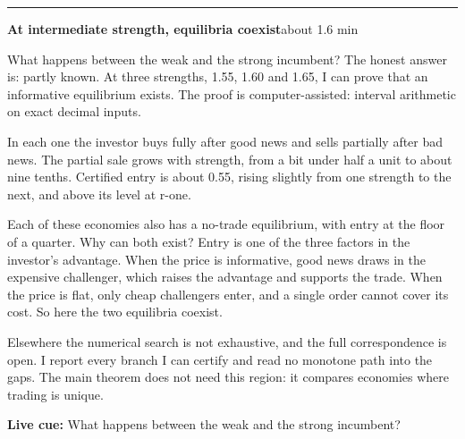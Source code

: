 \documentclass[11pt]{article}
\newcommand{\Cue}[1]{\par\nobreak\smallskip\noindent
  \textcolor{ScriptGray}{\footnotesize\textbf{Live cue:} #1}\par}
\newcommand{\scriptframe}[3]{%
  \Needspace{9\baselineskip}%
  \par\medskip\noindent\textcolor{ScriptBlue}{\rule{\linewidth}{0.55pt}}%
  \par\smallskip\noindent
  \textbf{#1}\hfill\textcolor{ScriptGray}{\small #2}\par\smallskip
  #3\par}
\begin{document}
\scriptframe{At intermediate strength, equilibria coexist}{about 1.6 min}{%
  What happens between the weak and the strong incumbent? The honest answer is:
  partly known. At three strengths, 1.55, 1.60 and 1.65, I can prove that an
  informative equilibrium exists.
  The proof is computer-assisted: interval arithmetic on exact decimal inputs.

  In each one the investor buys fully after good news and sells partially after
  bad news. The partial sale grows with strength, from a bit under half a unit
  to about nine tenths.
  Certified entry is about 0.55, rising slightly from one strength to the next,
  and above its level at r-one.

  Each of these economies also has a no-trade equilibrium, with entry at the
  floor of a quarter.
  Why can both exist? Entry is one of the three factors in the investor's
  advantage. When the price is informative, good news draws in the expensive
  challenger, which raises the advantage and supports the trade. When the price
  is flat, only cheap challengers enter, and a single order cannot cover its
  cost. So here the two equilibria coexist.

  Elsewhere the numerical search is not exhaustive, and the full correspondence
  is open. I report every branch I can certify and read no monotone path into
  the gaps. The main theorem does not need this region: it compares economies
  where trading is unique.
  \Cue{What happens between the weak and the strong incumbent?}
}
\end{document}
